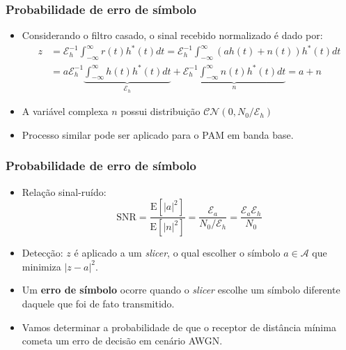 \begin{frame}
	\frametitle{Probabilidade de erro de símbolo}

	\begin{itemize}
	    \item Considerando o filtro casado, o sinal recebido normalizado é dado por:
	    \begin{align*}
		   z &= \mathcal{E}_h^{-1}\int_{-\infty}^{\infty} r(t) h^*(t) dt =  \mathcal{E}_h^{-1}\int_{-\infty}^{\infty} (ah(t) + n(t)) h^*(t) dt \\ &= a\mathcal{E}_h^{-1}\underbrace{\int_{-\infty}^{\infty} h(t) h^*(t) dt}_{\mathcal{E}_h} + \underbrace{\mathcal{E}_h^{-1}\int_{-\infty}^{\infty} n(t) h^*(t) dt}_{n} = a + n
	    \end{align*}
	    \item A variável complexa $n$ possui distribuição $\mathcal{CN}(0,N_0/\mathcal{E}_h)$
	    \item Processo similar pode ser aplicado para o PAM em banda base.
	\end{itemize}	
\end{frame}

\begin{frame}
	\frametitle{Probabilidade de erro de símbolo}

	\begin{itemize}
	    \item Relação sinal-ruído:
	    \begin{equation*}
		    \mathrm{SNR} = \frac{\mathrm{E}[|a|^2]}{\mathrm{E}[|n|^2]} = \frac{\mathcal{E}_a}{N_0/\mathcal{E}_h} = \frac{\mathcal{E}_a\mathcal{E}_h}{N_0}
	    \end{equation*}
	    \item Detecção: $z$ é aplicado a um \textit{slicer}, o qual escolher o símbolo $a \in \mathcal{A}$ que minimiza $|z-a|^2$.
	    \item Um \textbf{erro de símbolo} ocorre quando o \textit{slicer} escolhe um símbolo diferente daquele que foi de fato transmitido.
	    \item Vamos determinar a probabilidade de que o receptor de distância mínima cometa um erro de decisão em cenário AWGN.
	\end{itemize}	
\end{frame}


